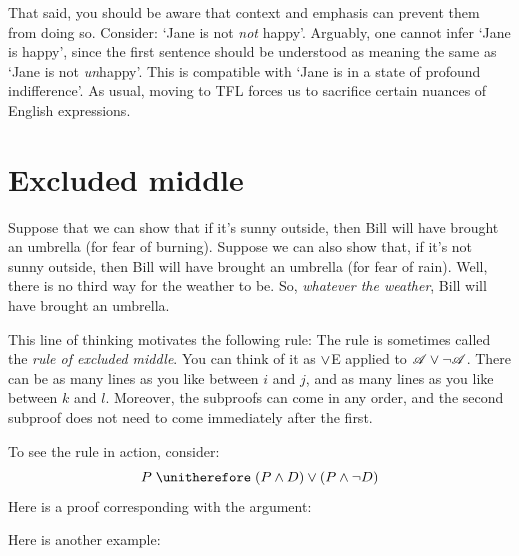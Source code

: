 That said, you should be aware that context and emphasis can prevent them from doing so. Consider: `Jane is not \emph{not} happy'. Arguably, one cannot infer `Jane is happy', since the first sentence should be understood as meaning the same as  `Jane is not \emph{un}happy'. This is compatible with `Jane is in a state of profound indifference'. As usual, moving to TFL forces us to sacrifice certain nuances of English expressions.

\section{Excluded middle}

Suppose that we can show that if it's sunny outside, then Bill will have brought an umbrella (for fear of burning). Suppose we can also show that, if it's not sunny outside, then Bill will have brought an umbrella (for fear of rain). Well, there is no third way for the weather to be. So, \emph{whatever the weather}, Bill will have brought an umbrella.

This line of thinking motivates the following rule:
The rule is sometimes called the \emph{rule of excluded middle}. You
can think of it as $\vee$E applied to $\mathscr{A} \vee \neg \mathscr{A}$.
There can be as many lines as you like between $i$ and $j$, and as
many lines as you like between $k$ and $l$. Moreover, the subproofs
can come in any order, and the second subproof does not need to come
immediately after the first.

To see the rule in action, consider:
	$$P \therefore (P \eand D) \eor (P \eand \enot D)$$
Here is a proof corresponding with the argument:
	\begin{fitchproof}
		\PR
		\open
			\AS
		\close
		\open
			\AS
		\close
	\end{fitchproof}
Here is another example:
\begin{fitchproof}
	\PR
	\open
		\hypo{a}{A}\AS
		\ce{ana, a}
	\close
	\open
		\hypo{na1}{\enot A}\AS
		\by{R}{na1}
	\close
	\tnd{a-na, na1-na2}
\end{fitchproof}


